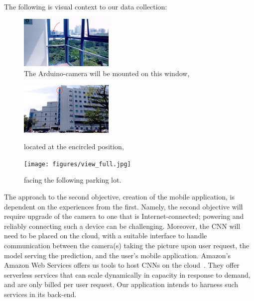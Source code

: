 \documentclass[a4paper, 11pt]{article} %
\begin{document}
		\hspace*{-6mm}The following is visual context to our data collection:
		\vskip 5mm
		\begin{figure}[h]
		    \centering
		    \includegraphics[width=0.4\textwidth]{figures/context_used.jpg}
		    \caption{The Arduino-camera will be mounted on this window,}
		\end{figure}
	
		\begin{figure}[h]
			\centering
			\includegraphics[width=0.4\textwidth]{figures/context2_used.jpg}
			\caption{located at the encircled position,}
			\vskip 5mm
		    \texttt{[image: figures/view\_full.jpg]}
		    \caption{facing the following parking lot.}
		\end{figure}
		\newpage
		The approach to the second objective, creation of the mobile application, is dependent on the 
		experiences from the first. Namely, the second objective will require upgrade of the camera to one 
		that is Internet-connected; powering and reliably connecting such a device can be challenging. 
		Moreover, the CNN will need to be placed on the cloud, with a suitable interface to handle 
		communication between the camera(s) taking the picture upon user request, the model serving 
		the prediction, and the user's mobile application. Amazon's Amazon Web Services offers us tools 
		to host CNNs on the cloud~\cite{aws}\relax. They offer serverless services that can scale 
		dynamically in capacity in response to demand, and are only billed per user request. Our 
		application intends to harness such services in its back-end.
		
\end{document}
